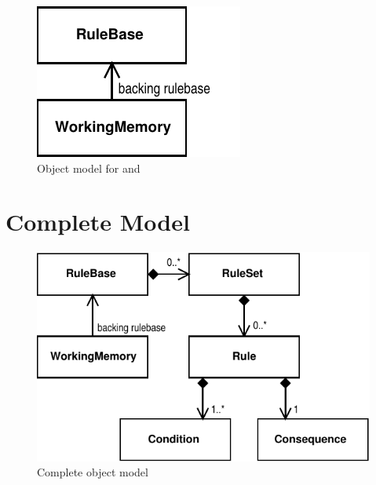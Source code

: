 \begin{figure}
  \begin{center}
  \includegraphics{workingmemory}
  \end{center}
  \caption{Object model for  and }
\end{figure}

\clearpage

\section{Complete Model}

\begin{figure}[h]
  \begin{center}
  \includegraphics{architecture}
  \end{center}
  \caption{Complete object model}
\end{figure}
